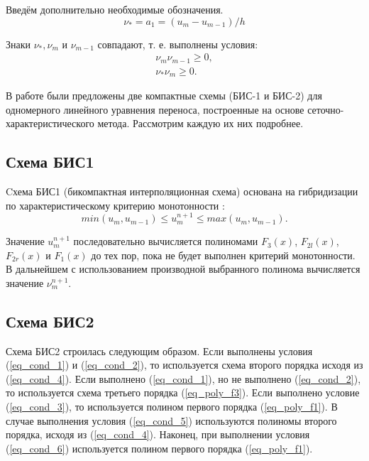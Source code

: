 \documentclass[11pt]{article}
\begin{document}
Введём дополнительно необходимые обозначения.
$$
\nu_* = a_1 = (u_m - u_{m-1}) /h
$$

Знаки $\nu_*, \nu_m$ и $\nu_{m-1}$ совпадают, т. е. выполнены условия:
\begin{equation}
\label{eq_cond_1}
\begin{array}{l}
\nu_m \nu_{m-1} \ge 0, \\
\nu_* \nu_m \ge 0.
\end{array}
\end{equation}

В работе \cite{Khokhlov1D2014} были предложены две компактные схемы (БИС-1 и БИС-2) для одномерного
линейного уравнения переноса, построенные на основе сеточно-характеристического метода.
Рассмотрим каждую их них подробнее.

\subsection{Схема БИС1}

Cхема БИС1 (бикомпактная интерполяционная схема) основана на гибридизации по характеристическому критерию монотонности \cite{Khol2006, Magometov-Kholodov-1969}:
\begin{equation}
\label{eq_cond_gc}
min(u_m, u_{m-1}) \le u^{n+1}_m \le max(u_m, u_{m-1}).
\end{equation}

Значение $u^{n+1}_m$ последовательно вычисляется полиномами $F_3(x)$, $F_{2l}(x)$, $F_{2r}(x)$ и $F_1(x)$ до тех пор, пока не будет выполнен критерий монотонности.
В дальнейшем с использованием производной выбранного полинома вычисляется значение $\nu^{n+1}_m$.

\subsection{Схема БИС2}

Схема БИС2 строилась следующим образом.
Если выполнены условия (\ref{eq_cond_1}) и (\ref{eq_cond_2}), то используется схема второго порядка исходя из (\ref{eq_cond_4}).
Если выполнено (\ref{eq_cond_1}), но не выполнено (\ref{eq_cond_2}), то используется схема третьего порядка (\ref{eq_poly_f3}).
Если выполнено условие (\ref{eq_cond_3}), то используется полином первого порядка (\ref{eq_poly_f1}).
В случае выполнения условия (\ref{eq_cond_5}) используются полиномы второго порядка, исходя из (\ref{eq_cond_4}).
Наконец, при выполнении условия (\ref{eq_cond_6}) используется полином первого порядка (\ref{eq_poly_f1}).
\end{document}
